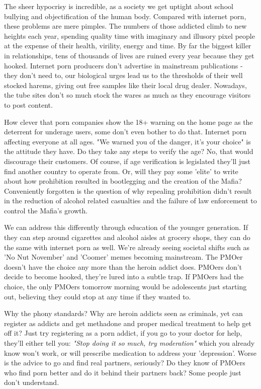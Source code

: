 \documentclass[easypeasy.tex]{subfiles}
\begin{document}
The sheer hypocrisy is incredible, as a society we get uptight about school bullying and objectification of the human body. Compared with internet porn, these problems are mere pimples. The numbers of those addicted climb to new heights each year, spending quality time with imaginary and illusory pixel people at the expense of their health, virility, energy and time. By far the biggest killer in relationships, tens of thousands of lives are ruined every year because they get hooked. Internet porn producers don't advertise in mainstream publications - they don't need to, our biological urges lead us to the thresholds of their well stocked harems, giving out free samples like their local drug dealer. Nowadays, the tube sites don't so much stock the wares as much as they encourage visitors to post content.

How clever that porn companies show the 18+ warning on the home page as the deterrent for underage users, some don't even bother to do that. Internet porn affecting everyone at all ages. "We warned you of the danger, it's your choice" is the attitude they have. Do they take any steps to verify the age? No, that would discourage their customers. Of course, if age verification is legislated they'll just find another country to operate from. Or, will they pay some 'elite' to write about how prohibition resulted in bootlegging and the creation of the Mafia? Conveniently forgotten is the question of why repealing prohibition didn't result in the reduction of alcohol related casualties and the failure of law enforcement to control the Mafia's growth.

We can address this differently through education of the younger generation. If they can step around cigarettes and alcohol aisles at grocery shops, they can do the same with internet porn as well. We're already seeing societal shifts such as 'No Nut November' and 'Coomer' memes becoming mainstream. The PMOer doesn't have the choice any more than the heroin addict does. PMOers don't decide to become hooked, they're lured into a subtle trap. If PMOers had the choice, the only PMOers tomorrow morning would be adolescents just starting out, believing they could stop at any time if they wanted to.

Why the phony standards? Why are heroin addicts seen as criminals, yet can register as addicts and get methadone and proper medical treatment to help get off it? Just try registering as a porn addict, if you go to your doctor for help, they'll either tell you: \textit{"Stop doing it so much, try moderation"} which you already know won't work, or will prescribe medication to address your 'depression'. Worse is the advice to go and find real partners, seriously? Do they know of PMOers who find porn better and do it behind their partners back? Some people just don't understand.
\end{document}
